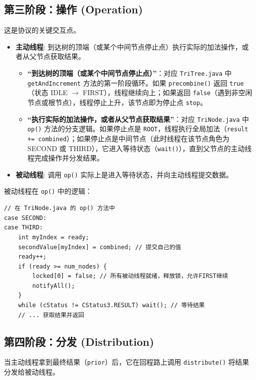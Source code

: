 \documentclass[UTF8,a4paper,12pt]{ctexart}
\begin{document}
\subsection{第三阶段：操作 (Operation)}
这是协议的关键交互点。
\begin{itemize}
    \item \textbf{主动线程}: 到达树的顶端（或某个中间节点停止点）执行实际的加法操作，或者从父节点获取结果。
    \begin{itemize}
        \item \textbf{“到达树的顶端（或某个中间节点停止点）”}：对应 \texttt{TriTree.java} 中 \texttt{getAndIncrement} 方法的第一阶段循环。如果 \texttt{precombine()} 返回 \texttt{true}（状态 IDLE $\rightarrow$ FIRST），线程继续向上；如果返回 \texttt{false}（遇到非空闲节点或根节点），线程停止上升，该节点即为停止点 \texttt{stop}。
        \item \textbf{“执行实际的加法操作，或者从父节点获取结果”}：对应 \texttt{TriNode.java} 中 \texttt{op()} 方法的分支逻辑。如果停止点是 \texttt{ROOT}，线程执行全局加法（\texttt{result += combined}）；如果停止点是中间节点（此时线程在该节点角色为 SECOND 或 THIRD），它进入等待状态（\texttt{wait()}），直到父节点的主动线程完成操作并分发结果。
    \end{itemize}
    \item \textbf{被动线程}: 调用 \texttt{op()} 实际上是进入等待状态，并向主动线程提交数据。
\end{itemize}

被动线程在 \texttt{op()} 中的逻辑：
\begin{lstlisting}
// 在 TriNode.java 的 op() 方法中
case SECOND:    
case THIRD:
    int myIndex = ready;
    secondValue[myIndex] = combined; // 提交自己的值
    ready++;
    if (ready >= num_nodes) {
        locked[0] = false; // 所有被动线程就绪，释放锁，允许FIRST继续
        notifyAll();
    }   
    while (cStatus != CStatus3.RESULT) wait(); // 等待结果
    // ... 获取结果并返回
\end{lstlisting}

\subsection{第四阶段：分发 (Distribution)}
当主动线程拿到最终结果（\texttt{prior}）后，它在回程路上调用 \texttt{distribute()} 将结果分发给被动线程。
\end{document}
